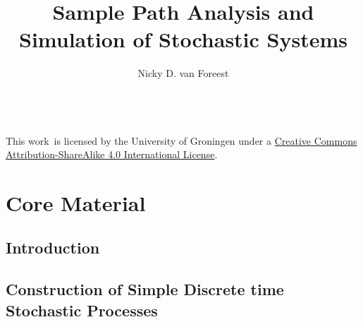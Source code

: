 
\title{Sample Path Analysis  and Simulation  of Stochastic Systems}
\author{Nicky D. van  Foreest}


\frontmatter
\maketitle

\noindent
\href{https://creativecommons.org/licenses/by-sa/4.0/}{\ccbysa} \\
This work\ is licensed by the University of Groningen under a
\href{https://creativecommons.org/licenses/by-sa/4.0/}{Creative Commons Attribution-ShareAlike 4.0 International License}.

\tableofcontents

\newpage

\tableofcontents





\mainmatter

\part{Core Material}

\chapter{Introduction}
\label{cha:introduction}







\chapter{Construction of Simple Discrete time Stochastic Processes}
\label{cha:single-stat-queu}


